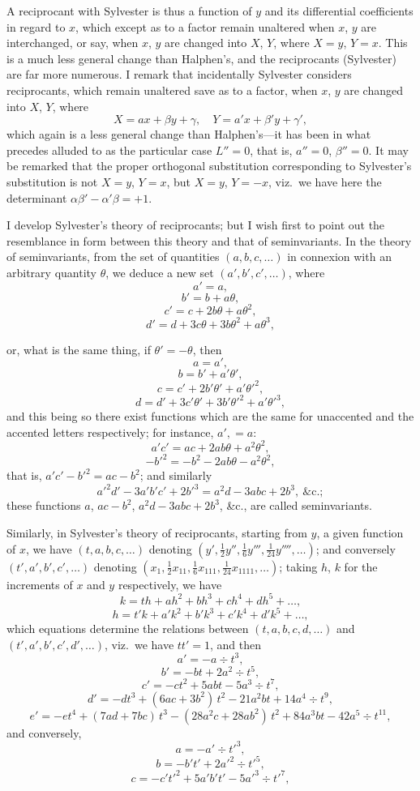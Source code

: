 \documentclass[11pt]{article}
\begin{document}
A reciprocant with Sylvester is thus a function of $y$ and its differential coefficients in regard to $x$, which except as to a factor remain unaltered when $x$, $y$ are interchanged, or say, when $x$, $y$ are changed into $X$, $Y$, where $X = y$, $Y = x$. This is a much less general change than Halphen's, and the reciprocants (Sylvester) are far more numerous. I remark that incidentally Sylvester considers reciprocants, which remain unaltered save as to a factor, when $x$, $y$ are changed into $X$, $Y$, where
\[
X = a x + \beta y + \gamma,\quad Y = a' x + \beta' y + \gamma',
\]
which again is a less general change than Halphen's---it has been in what precedes alluded to as the particular case $L'' = 0$, that is, $a'' = 0$, $\beta'' = 0$. It may be remarked that the proper orthogonal substitution corresponding to Sylvester's substitution is not $X = y$, $Y = x$, but $X = y$, $Y = -x$, viz.\ we have here the determinant $\alpha\beta' - \alpha'\beta = +1$.

I develop Sylvester's theory of reciprocants; but I wish first to point out the resemblance in form between this theory and that of seminvariants. In the theory of seminvariants, from the set of quantities $(a, b, c, \ldots)$ in connexion with an arbitrary quantity $\theta$, we deduce a new set $(a', b', c', \ldots)$, where
\[
a' = a,
\]
\[
b' = b + a\theta,
\]
\[
c' = c + 2 b\theta + a\theta^2,
\]
\[
d' = d + 3 c\theta + 3 b\theta^2 + a\theta^3,
\]

or, what is the same thing, if $\theta' = -\theta$, then
\[
a = a',
\]
\[
b = b' + a'\theta',
\]
\[
c = c' + 2 b'\theta' + a'\theta'^2,
\]
\[
d = d' + 3 c'\theta' + 3 b'\theta'^2 + a'\theta'^3,
\]
and this being so there exist functions which are the same for unaccented and the accented letters respectively; for instance, $a', = a$:
\[
a'c' = a c + 2 a b\theta + a^2\theta^2,
\]
\[
-b'^2 = -b^2 - 2 a b\theta - a^2\theta^2,
\]
that is, $a'c' - b'^2 = a c - b^2$; and similarly
\[
a'^2 d' - 3 a' b' c' + 2 b'^3 = a^2 d - 3 a b c + 2 b^3,\ \&\mathrm{c}.;
\]
these functions $a$, $a c - b^2$, $a^2 d - 3 a b c + 2 b^3$, \&c., are called seminvariants.

Similarly, in Sylvester's theory of reciprocants, starting from $y$, a given function of $x$, we have $(t, a, b, c, \ldots)$ denoting $(y', \tfrac{1}{2} y'', \tfrac{1}{6} y''', \tfrac{1}{24} y'''', \ldots)$; and conversely $(t', a', b', c', \ldots)$ denoting $(x_1, \tfrac{1}{2} x_{11}, \tfrac{1}{6} x_{111}, \tfrac{1}{24} x_{1111}, \ldots)$; taking $h$, $k$ for the increments of $x$ and $y$ respectively, we have
\[
k = t h + a h^2 + b h^3 + c h^4 + d h^5 + \ldots,
\]
\[
h = t' k + a' k^2 + b' k^3 + c' k^4 + d' k^5 + \ldots,
\]
which equations determine the relations between $(t, a, b, c, d, \ldots)$ and $(t', a', b', c', d', \ldots)$, viz.\ we have $t t' = 1$, and then
\[
a' = -a \div t^3,
\]
\[
b' = -b t + 2 a^2 \div t^5,
\]
\[
c' = -c t^2 + 5 a b t - 5 a^3 \div t^7,
\]
\[
d' = -d t^3 + (6 a c + 3 b^2)\,t^2 - 21 a^2 b t + 14 a^4 \div t^9,
\]
\[
e' = -e t^4 + (7 a d + 7 b c)\,t^3 - (28 a^2 c + 28 a b^2)\,t^2 + 84 a^3 b t - 42 a^5 \div t^{11},
\]
and conversely,
\[
a = -a' \div t'^3,
\]
\[
b = -b' t' + 2 a'^2 \div t'^5,
\]
\[
c = -c' t'^2 + 5 a' b' t' - 5 a'^3 \div t'^7,
\]
\end{document}
